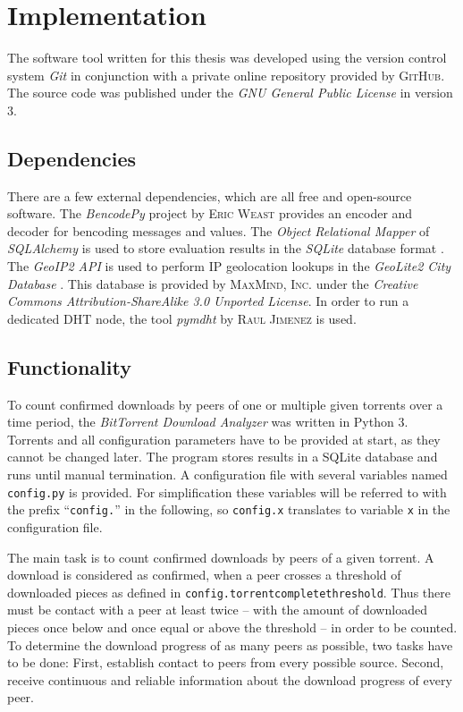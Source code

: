 \documentclass[10pt, a4paper]{scrartcl} %
\renewcommand{\_}{\origunderscore\allowbreak}
\newcommand{\config}[1]{\texttt{config.\allowbreak #1}}
\begin{document}
\section{Implementation}
The software tool written for this thesis was developed using the version control system \emph{Git} \cite{git} in conjunction with a private online repository provided by \textsc{GitHub}. The source code was published \cite{btda} under the \emph{GNU General Public License} in version 3.

\subsection{Dependencies}
There are a few external dependencies, which are all free and open-source software. The \emph{BencodePy} project by \textsc{Eric Weast} \cite{bencodepy} provides an encoder and decoder for bencoding messages and values. The \emph{Object Relational Mapper} of \emph{SQLAlchemy} \cite{sqlalchemy} is used to store evaluation results in the \emph{SQLite} database format \cite{sqlite}. The \emph{GeoIP2 API} \cite{geoip2-api} is used to perform IP geolocation lookups in the \emph{GeoLite2 City Database} \cite{geolite2-db}. This database is provided by \textsc{MaxMind, Inc.} under the \emph{Creative Commons Attribution-ShareAlike 3.0 Unported License}. In order to run a dedicated DHT node, the tool \emph{pymdht} by \textsc{Raul Jimenez} \cite{pymdht} is used.

\subsection{Functionality}
To count confirmed downloads by peers of one or multiple given torrents over a time period, the \emph{BitTorrent Download Analyzer} was written in Python 3. Torrents and all configuration parameters have to be provided at start, as they cannot be changed later. The program stores results in a SQLite database and runs until manual termination. A configuration file with several variables named \texttt{config.py} is provided. For simplification these variables will be referred to with the prefix ``\texttt{config.}'' in the following, so \config{x} translates to variable \texttt{x} in the configuration file.

The main task is to count confirmed downloads by peers of a given torrent. A download is considered as confirmed, when a peer crosses a threshold of downloaded pieces as defined in \config{torrent\_complete\_threshold}. Thus there must be contact with a peer at least twice -- with the amount of downloaded pieces once below and once equal or above the threshold -- in order to be counted. To determine the download progress of as many peers as possible, two tasks have to be done: First, establish contact to peers from every possible source. Second, receive continuous and reliable information about the download progress of every peer.
\end{document}
